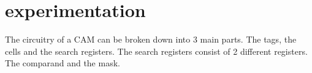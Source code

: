 \section{experimentation}
The circuitry of a CAM can be broken down into 3 main parts. The tags, the cells and the search registers. 
The search registers consist of 2 different registers. The comparand and the mask. 